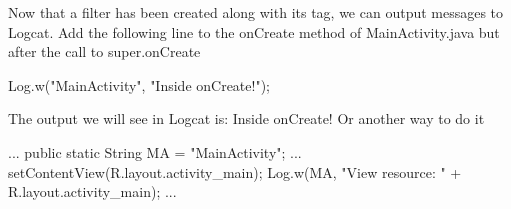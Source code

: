 \documentclass{report}
\begin{document}
\begin{itemize}
             \bigbreak \noindent 
             Now that a filter has been created along with its tag, we can output messages to Logcat.
             \bigbreak \noindent 
             Add the following line to the onCreate method of MainActivity.java but after the call to super.onCreate
             \bigbreak \noindent 
             \begin{javacode}
                 Log.w("MainActivity", "Inside onCreate!");
             \end{javacode}
             \bigbreak \noindent 
             The output we will see in Logcat is: Inside onCreate!
             \bigbreak \noindent 
             Or another way to do it
             \bigbreak \noindent 
             \begin{javacode}
                 ...
                 public static String MA = "MainActivity";
                 ...
                 setContentView(R.layout.activity_main);
                 Log.w(MA, "View resource: " +
                 R.layout.activity_main);
                 ... 
             \end{javacode}
    \end{itemize}

    \pagebreak 
\end{document}
